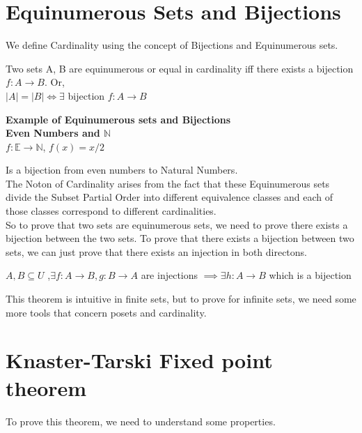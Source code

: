 \section{Equinumerous Sets and Bijections}

We define Cardinality using the concept of Bijections and Equinumerous sets.
\begin{theorem}
Two sets A, B are equinumerous or equal in cardinality iff there
exists a bijection $f: A \to B$. Or,\\

$ |A| = |B| \Leftrightarrow \exists$ bijection $f:A \to B $ \\

\end{theorem}

\textbf{Example of Equinumerous sets and Bijections}\\

\textbf{Even Numbers and $\mathbb{N}$}\\

$f:\mathbb{E} \to \mathbb{N}$,  $f(x) = x/2$

Is a bijection from even numbers to Natural Numbers.\\

The Noton of Cardinality arises from the fact that these Equinumerous sets divide the Subset Partial Order into different equivalence classes and each of those classes correspond to different cardinalities. \\

So to prove that two sets are equinumerous sets, we need to prove there exists a bijection between the two sets. To prove that there exists a bijection between two sets, we can just prove that there exists an injection in both directons.

\begin{theorem}
$A,B \subseteq U$ ,$\exists f:A \to B, g:B \to A$ are injections $\implies \exists h:A \to B$ which is a bijection 
\end{theorem}

This theorem is intuitive in finite sets, but to prove for infinite sets, we need some more tools that concern posets and cardinality.

\section{Knaster-Tarski Fixed point theorem}

To prove this theorem, we need to understand some properties.

